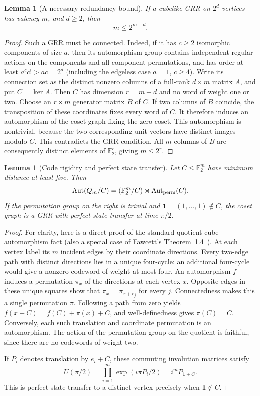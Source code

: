 \documentclass[11pt,a4paper]{article}
\newtheorem{lemma}[theorem]{Lemma}
\theoremstyle{definition}
\theoremstyle{remark}
\begin{document}
\begin{lemma}[A necessary redundancy bound]
\label{t94:redundancy}
If a cubelike GRR on $2^d$ vertices has valency $m$, and $d\ge2$, then
\[
 m\le 2^{m-d}.
\]
\end{lemma}
\begin{proof}
Such a GRR must be connected. Indeed, if it has $c\ge2$ isomorphic
components of size $a$, then its automorphism group contains independent
regular actions on the components and all component permutations, and has
order at least $a^c c!>ac=2^d$ (including the edgeless case $a=1$, $c\ge4$).
Write its connection set as the distinct nonzero columns of a full-rank
$d\times m$ matrix $A$, and put $C=\ker A$. Then $C$ has dimension
$r=m-d$ and no word of weight one or two. Choose an $r\times m$ generator
matrix $B$ of $C$. If two columns of $B$ coincide, the transposition of
these coordinates fixes every word of $C$. It therefore induces an
automorphism of the coset graph fixing the zero coset. This automorphism
is nontrivial, because the two corresponding unit vectors have distinct
images modulo $C$. This contradicts the GRR condition. All $m$ columns
of $B$ are consequently distinct elements of $\mathbb F_2^r$, giving
$m\le2^r$.
\end{proof}

\begin{lemma}[Code rigidity and perfect state transfer]
\label{t94:quotient}
Let $C\le\mathbb F_2^m$ have minimum distance at least five. Then
\[
 \operatorname{Aut}(Q_m/C)
 = (\mathbb F_2^m/C)\rtimes\operatorname{Aut}_{\rm perm}(C).
\]
If the permutation group on the right is trivial and
$\boldsymbol1=(1,\ldots,1)\notin C$, the coset graph is a GRR with
perfect state transfer at time $\pi/2$.
\end{lemma}
\begin{proof}
For clarity, here is a direct proof of the standard quotient-cube
automorphism fact (also a special case of Fawcett's Theorem~1.4~\cite{retry:fawcett}).
At each vertex label its $m$ incident edges by their coordinate directions.
Every two-edge path with distinct directions lies in a unique four-cycle:
an additional four-cycle would give a nonzero codeword of weight at most
four. An automorphism $f$ induces a permutation $\pi_x$ of the directions
at each vertex $x$. Opposite edges in these unique squares show that
$\pi_x=\pi_{x+e_j}$ for every $j$. Connectedness makes this a single
permutation $\pi$. Following a path from zero yields
$f(x+C)=f(C)+\pi(x)+C$, and well-definedness gives $\pi(C)=C$.
Conversely, each such translation and coordinate permutation is an
automorphism. The action of the permutation group on the quotient is
faithful, since there are no codewords of weight two.

If $P_i$ denotes translation by $e_i+C$, these commuting involution
matrices satisfy
\[
 U(\pi/2)=\prod_{i=1}^m\exp(i\pi P_i/2)
 =i^mP_{\boldsymbol1+C}.
\]
This is perfect state transfer to a distinct vertex precisely when
$\boldsymbol1\notin C$.
\end{proof}
\end{document}

